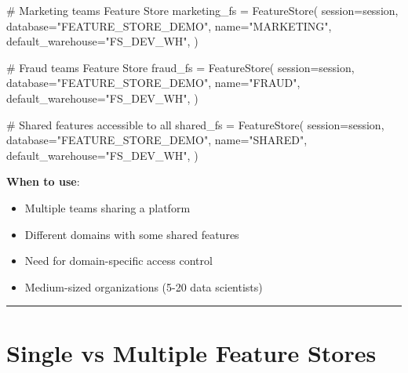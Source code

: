 \documentclass[
  letterpaper,
  DIV=11,
  numbers=noendperiod]{scrreprt}
\newenvironment{Shaded}{\begin{snugshade}}{\end{snugshade}}
\newcommand{\CommentTok}[1]{\textcolor[rgb]{0.37,0.37,0.37}{#1}}
\newcommand{\NormalTok}[1]{\textcolor[rgb]{0.00,0.23,0.31}{#1}}
\newcommand{\OperatorTok}[1]{\textcolor[rgb]{0.37,0.37,0.37}{#1}}
\newcommand{\StringTok}[1]{\textcolor[rgb]{0.13,0.47,0.30}{#1}}
\providecommand{\tightlist}{%
  \setlength{\itemsep}{0pt}\setlength{\parskip}{0pt}}\usepackage{longtable,booktabs,array}
\begin{document}
\begin{Shaded}
\begin{Highlighting}[]
\CommentTok{\# Marketing team\textquotesingle{}s Feature Store}
\NormalTok{marketing\_fs }\OperatorTok{=}\NormalTok{ FeatureStore(}
\NormalTok{    session}\OperatorTok{=}\NormalTok{session,}
\NormalTok{    database}\OperatorTok{=}\StringTok{"FEATURE\_STORE\_DEMO"}\NormalTok{,}
\NormalTok{    name}\OperatorTok{=}\StringTok{"MARKETING"}\NormalTok{,}
\NormalTok{    default\_warehouse}\OperatorTok{=}\StringTok{"FS\_DEV\_WH"}\NormalTok{,}
\NormalTok{)}

\CommentTok{\# Fraud team\textquotesingle{}s Feature Store}
\NormalTok{fraud\_fs }\OperatorTok{=}\NormalTok{ FeatureStore(}
\NormalTok{    session}\OperatorTok{=}\NormalTok{session,}
\NormalTok{    database}\OperatorTok{=}\StringTok{"FEATURE\_STORE\_DEMO"}\NormalTok{,}
\NormalTok{    name}\OperatorTok{=}\StringTok{"FRAUD"}\NormalTok{,}
\NormalTok{    default\_warehouse}\OperatorTok{=}\StringTok{"FS\_DEV\_WH"}\NormalTok{,}
\NormalTok{)}

\CommentTok{\# Shared features accessible to all}
\NormalTok{shared\_fs }\OperatorTok{=}\NormalTok{ FeatureStore(}
\NormalTok{    session}\OperatorTok{=}\NormalTok{session,}
\NormalTok{    database}\OperatorTok{=}\StringTok{"FEATURE\_STORE\_DEMO"}\NormalTok{,}
\NormalTok{    name}\OperatorTok{=}\StringTok{"SHARED"}\NormalTok{,}
\NormalTok{    default\_warehouse}\OperatorTok{=}\StringTok{"FS\_DEV\_WH"}\NormalTok{,}
\NormalTok{)}
\end{Highlighting}
\end{Shaded}

\textbf{When to use}:

\begin{itemize}
\tightlist
\item
  Multiple teams sharing a platform
\item
  Different domains with some shared features
\item
  Need for domain-specific access control
\item
  Medium-sized organizations (5-20 data scientists)
\end{itemize}

\begin{center}\rule{0.5\linewidth}{0.5pt}\end{center}

\hypertarget{single-vs-multiple-feature-stores}{%
\section{Single vs Multiple Feature
Stores}\label{single-vs-multiple-feature-stores}}
\end{document}
